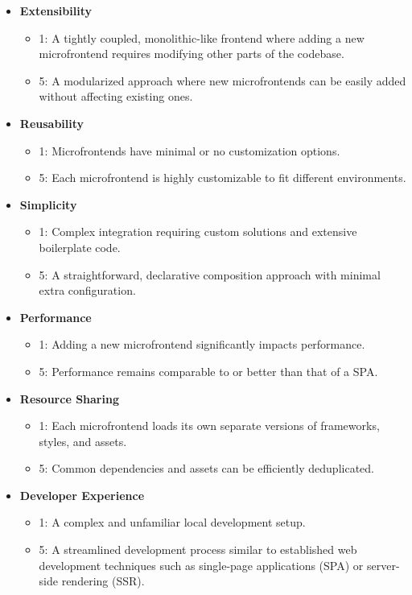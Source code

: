 \begin{itemize}
  \item \textbf{Extensibility} 
    \begin{itemize}
      \item 1: A tightly coupled, monolithic-like frontend where adding a new microfrontend requires modifying other parts of the codebase.
      \item 5: A modularized approach where new microfrontends can be easily added without affecting existing ones.
    \end{itemize}
  \item \textbf{Reusability} 
    \begin{itemize}
      \item 1: Microfrontends have minimal or no customization options.
      \item 5: Each microfrontend is highly customizable to fit different environments.
    \end{itemize}
  \item \textbf{Simplicity} 
    \begin{itemize}
      \item 1: Complex integration requiring custom solutions and extensive boilerplate code.
      \item 5: A straightforward, declarative composition approach with minimal extra configuration.
    \end{itemize}
  \item \textbf{Performance} 
    \begin{itemize}
      \item 1: Adding a new microfrontend significantly impacts performance.
      \item 5: Performance remains comparable to or better than that of a SPA.
    \end{itemize}
  \item \textbf{Resource Sharing} 
    \begin{itemize}
      \item 1: Each microfrontend loads its own separate versions of frameworks, styles, and assets.
      \item 5: Common dependencies and assets can be efficiently deduplicated.
    \end{itemize}
  \item \textbf{Developer Experience} 
    \begin{itemize}
      \item 1: A complex and unfamiliar local development setup.
      \item 5: A streamlined development process similar to established web development techniques such as single-page applications (SPA) or server-side rendering (SSR).
    \end{itemize}
\end{itemize}


